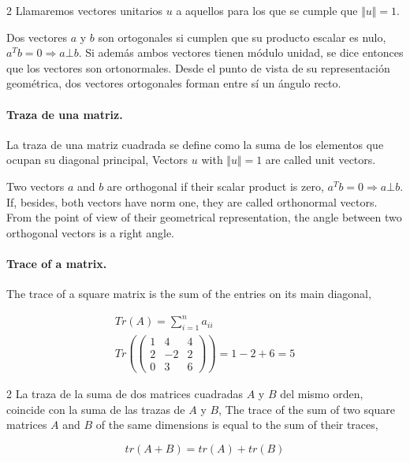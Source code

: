 \begin{paracol}{2}
Llamaremos vectores unitarios $u$ a aquellos para los que se cumple que $\Vert u \Vert=1$.

Dos vectores $a$ y $b$ son ortogonales si cumplen que su producto escalar es nulo, $a^Tb=0 \Rightarrow  a\bot b$. Si además ambos vectores tienen módulo unidad, se dice entonces que los vectores son ortonormales.  Desde el punto de vista de su representación geométrica, dos vectores ortogonales forman entre sí un ángulo recto.

\paragraph{Traza de una matriz.} La traza de una matriz cuadrada se define como la suma de los elementos que ocupan su diagonal principal,
\switchcolumn
Vectors $u$ with $\Vert u \Vert=1$ are called unit vectors.

Two vectors $a$ and $b$ are orthogonal if their scalar product is zero, $a^Tb = 0 \Rightarrow a\bot b$. If, besides, both vectors have norm one, they are called orthonormal vectors. From the point of view of their geometrical representation, the angle between two orthogonal vectors is a right angle.

\paragraph{Trace of a matrix.} The trace of a square matrix is the sum of the entries on its main diagonal, 
\end{paracol}
\begin{gather*}
Tr(A)=\sum_{i=1}^na_{ii}\\
Tr\left(
\begin{pmatrix}
1& 4 & 4\\
2& -2 & 2\\
0& 3 & 6
\end{pmatrix}\right)=1-2+6=5
\end{gather*}

\begin{paracol}{2}
La traza de la suma de dos matrices cuadradas $A$ y $B$ del mismo orden, coincide con la suma de las trazas de $A$ y $B$,
\switchcolumn
The trace of the sum of two square matrices $A$ and $B$ of the same dimensions is equal to the sum of their traces, 
\end{paracol}

\begin{equation*}
tr(A+B)=tr(A)+tr(B)
\end{equation*}

